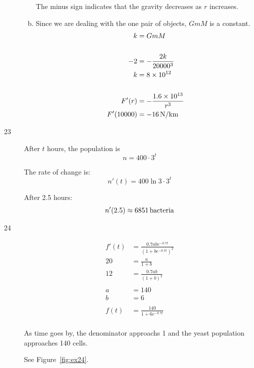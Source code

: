 \documentclass[letterpaper, landscape]{exam}
\begin{document}
\begin{description}
\begin{enumerate}[(a)]
          The minus sign indicates that the gravity decreases as $r$ increases.

        \item Since we are dealing with the one pair of objects, $GmM$ is a constant.
          \begin{align*}
            k         & = G m M \\
            \\
            -2        & = - \frac{2 k}{20000^3} \\
            k         & = 8 \times 10^{12} \\
            \\
            F'(r)     & = - \frac{1.6 \times 10^{13}}{r^3} \\
            F'(10000) & = \unit[-16]{N/km} \\
          \end{align*}

      \end{enumerate}

    \item[23]
      After $t$ hours, the population is 
      \[
        n = 400 \cdot 3^t 
      \]

      The rate of change is:
      \[
        n'(t) = 400 \ln 3 \cdot 3^t
      \]

      After 2.5 hours:
      \[
        n'(2.5) \approx \unit[6851]{bacteria}
      \]

    \item[24]
      \begin{align*}
        f'(t) &= \frac{0.7abe^{ - 0.7 t}}{\left( 1 + be^{ - 0.7 t} \right)^2}
        \\
        20 &= \frac{a}{1 + b} \\
        12 &= \frac{0.7 ab}{\left( 1 + b \right)^2} \\
        \\
        a &= 140 \\
        b &= 6 \\
        \\
        f(t) &= \frac{140}{1 + 6 e^{-0.7t}} \\
      \end{align*}

      As time goes by, the denominator approachs 1 and the yeast population approaches 140 cells. 
      
      See Figure~\ref{fig:ex24}.


\end{description}
\end{document}

